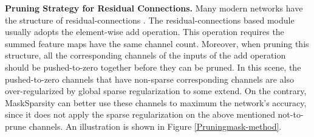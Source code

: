 \documentclass[review]{cvpr}
\begin{document}





\textbf{Pruning Strategy for Residual Connections. }\label{Pruning with Residual-Connections} 
Many modern networks have the structure of residual-connections \cite{he2016deep}. The residual-connections based module usually adopts the element-wise add operation. This operation requires the summed feature maps have the same channel count. Moreover, when pruning this structure, all the corresponding channels of the inputs of the add operation should be pushed-to-zero together before they can be pruned. In this scene, the pushed-to-zero channels that have non-sparse corresponding channels are also over-regularized by global sparse regularization to some extend. On the contrary, MaskSparsity can better use these channels to maximum the network's accuracy, since it does not apply the sparse regularization on the above mentioned not-to-prune channels. An illustration is shown in Figure \ref{Pruningmask-method}.
 
\end{document}
